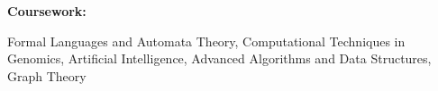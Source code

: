 {\noindent
\textbf{Coursework:}}

{\indent Formal Languages and Automata Theory, Computational Techniques in Genomics, Artificial Intelligence, Advanced Algorithms and Data Structures, Graph Theory}
